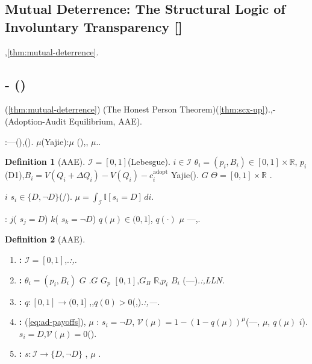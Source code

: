 \documentclass[12pt,a4paper]{article}
\theoremstyle{definition}
\newtheorem{definition}{Definition}[section]
\theoremstyle{remark}
\begin{document}
\subsection{Mutual Deterrence: The Structural Logic of Involuntary Transparency []}

,\ref{thm:mutual-deterrence}.

\subsection{- ()}

(\ref{thm:mutual-deterrence}) (The Honest Person Theorem)(\ref{thm:scx-up}).,-(Adoption-Audit Equilibrium, AAE).

:---(),(). $\mu$(Yajie):$\mu$ (),, $\mu$..

\begin{definition}[AAE]
\label{def:aae-continuum}
 $\mathcal{I} = [0,1]$(Lebesgue). $i \in \mathcal{I}$  $\theta_i = (p_i, B_i) \in [0,1] \times \mathbb{R}$, $p_i$ (D1),$B_i = V(Q_i + \Delta Q_i) - V(Q_i) - c_i^{\text{adopt}}$ Yajie(). $G$  $\Theta = [0,1] \times \mathbb{R}$ .

 $i$  $s_i \in \{D, \neg D\}$(/). $\mu = \int_{\mathcal{I}} \mathbb{I}[s_i = D] \, di$.

: $j$( $s_j = D$) $k$( $s_k = \neg D$) $q(\mu) \in (0, 1]$, $q(\cdot)$  $\mu$ ---,.
\end{definition}

\begin{definition}[AAE]
\label{def:aae-assumptions}
\begin{enumerate}[label=\textbf{E\arabic*}, leftmargin=*, itemsep=4pt]
\item \textbf{:}  $\mathcal{I} = [0,1]$,.\hfill\textit{:,.}

\item \textbf{:}  $\theta_i = (p_i, B_i)$  $G$ .$G$  $G_p$  $[0,1]$,$G_B$  $\mathbb{R}$,$p_i$  $B_i$ (---).\hfill\textit{:,LLN.}

\item \textbf{:} $q: [0,1] \to (0, 1]$ ,,$q(0) > 0$(,).\hfill\textit{:,---.}

\item \textbf{:} (\ref{eq:ad-payoffs}), $\mu$ : $s_i = \neg D$, $\mathcal{V}(\mu) = 1 - (1 - q(\mu))^{\mu}$(---, $\mu$, $q(\mu)$  $i$). $s_i = D$,$\mathcal{V}(\mu) = 0$().

\item \textbf{:}  $s: \mathcal{I} \to \{D, \neg D\}$ , $\mu$ .
\end{enumerate}
\end{definition}
\end{document}
